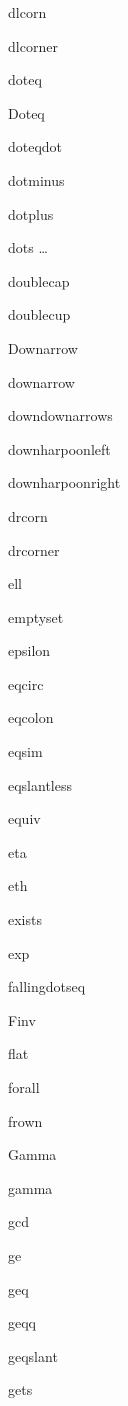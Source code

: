 \documentclass{article}
\begin{document}
dlcorn    \dlcorn{}

dlcorner    \dlcorner{}

doteq    \doteq{}

Doteq    \Doteq{}

doteqdot    \doteqdot{}

dotminus    \dotminus{}

dotplus    \dotplus{}

dots    \dots{}

doublecap    \doublecap{}

doublecup    \doublecup{}

Downarrow    \Downarrow{}

downarrow    \downarrow{}

downdownarrows    \downdownarrows{}

downharpoonleft    \downharpoonleft{}

downharpoonright    \downharpoonright{}

drcorn    \drcorn{}

drcorner    \drcorner{}


ell    \ell{}

emptyset    \emptyset{}

epsilon    \epsilon{}

eqcirc    \eqcirc{}

eqcolon    \eqcolon{}

eqsim    \eqsim{}

eqslantless    \eqslantless{}

equiv    \equiv{}

eta    \eta{}

eth    \eth{}

exists    \exists{}

exp    \exp{}


fallingdotseq    \fallingdotseq{}

Finv    \Finv{}

flat    \flat{}

forall    \forall{}

frown    \frown{}


Gamma    \Gamma{}

gamma    \gamma{}

gcd    \gcd{}

ge    \ge{}

geq    \geq{}

geqq    \geqq{}

geqslant    \geqslant{}

gets    \gets{}
\end{document}
